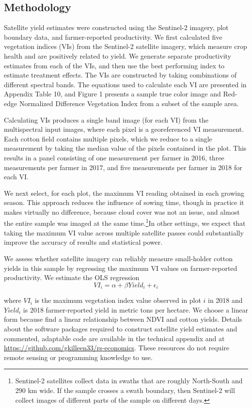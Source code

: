 \documentclass{article}
\begin{document}
\subsection{Methodology}

Satellite yield estimates were constructed using the Sentinel-2 imagery, plot boundary data, and farmer-reported productivity. We first calculated five vegetation indices (VIs) from the Sentinel-2 satellite imagery, which measure crop health and are positively related to yield. We generate separate productivity estimates from each of the VIs, and then use the best performing index to estimate treatment effects. The VIs are constructed by taking combinations of different spectral bands. The equations used to calculate each VI are presented in Appendix Table 10, and Figure 1 presents a sample true color image and Red-edge Normalized Difference Vegetation Index from a subset of the sample area. 

Calculating VIs produces a single band image (for each VI) from the multispectral input images, where each pixel is a georeferenced VI measurement. Each cotton field contains multiple pixels, which we reduce to a single measurement by taking the median value of the pixels contained in the plot. This results in a panel consisting of one measurement per farmer in 2016, three measurements per farmer in 2017, and five measurements per farmer in 2018 for each VI.  

We next select, for each plot, the maximum VI reading obtained in each growing season. This approach reduces the influence of sowing time, though in practice it makes virtually no difference, because cloud cover was not an issue, and almost the entire sample was imaged at the same time.\footnote{Sentinel-2 satellites collect data in swaths that are roughly North-South and 290 km wide. If the sample crosses a swath boundary, then Sentinel-2 will collect images of different parts of the sample on different days.}In other settings, we expect that taking the maximum VI value across multiple satellite passes could substantially improve the accuracy of results and statistical power.   

We assess whether satellite imagery can reliably measure small-holder cotton yields in this sample by regressing the maximum VI values on farmer-reported productivity. We estimate the OLS regression
$$
VI_i = \alpha + \beta Yield_i + \epsilon_i
$$

where $VI_i$ is the maximum vegetation index value observed in plot $i$ in 2018 and $Yield_i$ is 2018 farmer-reported yield in metric tons per hectare. We choose a linear form because \citet{Stamatiadis2010Ground-basedCotton} find a linear relationship between NDVI and cotton yields. Details about the software packages required to construct satellite yield estimates and commented, adaptable code are available in the technical appendix and at \url{https://github.com/gkilleen33/rs-economics}. These resources do not require remote sensing  or programming knowledge to use.
\end{document}
